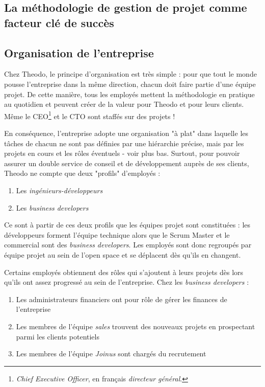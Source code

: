 \subsection{La méthodologie de gestion de projet comme facteur clé de succès}



\subsection{Organisation de l'entreprise}

Chez Theodo, le principe d'organisation est très simple : pour que tout le monde pousse l'entreprise dans la même direction, chacun doit faire partie d'une équipe projet. De cette manière, tous les employés mettent la méthodologie en pratique au quotidien et peuvent créer de la valeur pour Theodo et pour leurs clients. Même le CEO\footnote{\textit{\foreignlanguage{english}{Chief Executive Officer}}, en français \textit{directeur général}.} et le CTO sont staffés sur des projets !

En conséquence, l'entreprise adopte une organisation "à plat" dans laquelle les tâches de chacun ne sont pas définies par une hiérarchie précise, mais par les projets en cours et les rôles éventuels - voir plus bas. Surtout, pour pouvoir assurer un double service de conseil et de développement auprès de ses clients, Theodo ne compte que deux "profils" d'employés :
\begin{enumerate}
\item{Les \textit{ingénieurs-développeurs}}
\item{Les \textit{\foreignlanguage{english}{business developers}}}
\end{enumerate}

Ce sont à partir de ces deux profils que les équipes projet sont constituées : les développeurs forment l'équipe technique alors que le Scrum Master et le commercial sont des \textit{\foreignlanguage{english}{business developers}}. Les employés sont donc regroupés par équipe projet au sein de l'open space et se déplacent dès qu'ils en changent.

Certains employés obtiennent des rôles qui s'ajoutent à leurs projets dès lors qu'ils ont assez progressé au sein de l'entreprise. Chez les \textit{\foreignlanguage{english}{business developers}} :
\begin{enumerate}
\item{Les administrateurs financiers ont pour rôle de gérer les finances de l'entreprise}
\item{Les membres de l'équipe \textit{\foreignlanguage{english}{sales}} trouvent des nouveaux projets en prospectant parmi les clients potentiels}
\item{Les membres de l'équipe \textit{\foreignlanguage{english}{Joinus}} sont chargés du recrutement}
\end{enumerate}

